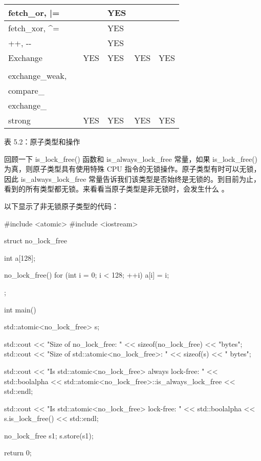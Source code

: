 \begin{longtable}{|l|l|l|l|l|l|}
fetch\_or, |=                                                                                         &     &     & YES &     &     \\ \hline
fetch\_xor, \textasciicircum{}=                                                                       &     &     & YES &     &     \\ \hline
++, -{}-                                                                                                &     &     & YES &     &     \\ \hline
Exchange                                                                                              &     & YES & YES & YES & YES \\ \hline
\begin{tabular}[c]{@{}l@{}}compare\_\\ exchange\_weak,\\ compare\_\\ exchange\_\\ strong\end{tabular} &     & YES & YES & YES & YES \\ \hline
\end{longtable}

\begin{center}
表 5.2：原子类型和操作
\end{center}

回顾一下 is\_lock\_free() 函数和 is\_always\_lock\_free 常量，如果 is\_lock\_free() 为真，则原子类型具有使用特殊 CPU 指令的无锁操作。原子类型有时可以无锁，因此 is\_always\_lock\_free 常量告诉我们该类型是否始终是无锁的。到目前为止，看到的所有类型都无锁。来看看当原子类型是非无锁时，会发生什么
。

以下显示了非无锁原子类型的代码：

\begin{cpp}
#include <atomic>
#include <iostream>

struct no_lock_free {
    int a[128];

    no_lock_free() {
        for (int i = 0; i < 128; ++i) {
            a[i] = i;
        }
    }
};

int main() {
    std::atomic<no_lock_free> s;

    std::cout << "Size of no_lock_free: " << sizeof(no_lock_free) << "bytes\n";
    std::cout << "Size of std::atomic<no_lock_free>: " << sizeof(s) <<
    " bytes\n";

    std::cout << "Is std::atomic<no_lock_free> always lock-free: " <<
    std::boolalpha << std::atomic<no_lock_free>::is_always_lock_free <<
    std::endl;

    std::cout << "Is std::atomic<no_lock_free> lock-free: " <<
    std::boolalpha << s.is_lock_free() << std::endl;

    no_lock_free s1;
    s.store(s1);

    return 0;
}
\end{cpp}

